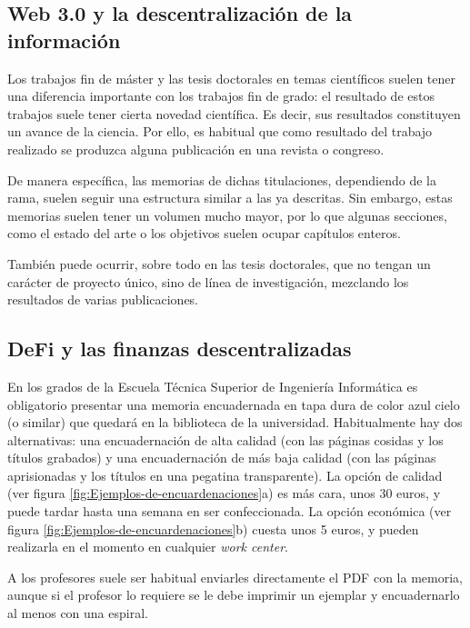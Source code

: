 \documentclass[12pt,spanish,chapterprefix, numbers=noenddot]{book}
\numberwithin{equation}{section}
\numberwithin{figure}{section}
\begin{document}
    \subsection{Web 3.0 y la descentralización de la información}

    Los trabajos fin de máster y las tesis doctorales en temas científicos
    suelen tener una diferencia importante con los trabajos fin de grado:
    el resultado de estos trabajos suele tener cierta novedad científica.
    Es decir, sus resultados constituyen un avance de la ciencia. Por
    ello, es habitual que como resultado del trabajo realizado se produzca
    alguna publicación en una revista o congreso.

    De manera específica, las memorias de dichas titulaciones, dependiendo
    de la rama, suelen seguir una estructura similar a las ya descritas.
    Sin embargo, estas memorias suelen tener un volumen mucho mayor, por
    lo que algunas secciones, como el estado del arte o los objetivos
    suelen ocupar capítulos enteros.

    También puede ocurrir, sobre todo en las tesis doctorales, que no
    tengan un carácter de proyecto único, sino de línea de investigación,
    mezclando los resultados de varias publicaciones.

    \subsection{DeFi y las finanzas descentralizadas}

    En los grados de la Escuela Técnica Superior de Ingeniería Informática
    es obligatorio presentar una memoria encuadernada en tapa dura de
    color azul cielo (o similar) que quedará en la biblioteca de la universidad.
    Habitualmente hay dos alternativas: una encuadernación de alta calidad
    (con las páginas cosidas y los títulos grabados) y una encuadernación
    de más baja calidad (con las páginas aprisionadas y los títulos en
    una pegatina transparente). La opción de calidad (ver figura \ref{fig:Ejemplos-de-encuardenaciones}a)
    es más cara, unos 30 euros, y puede tardar hasta una semana en ser
    confeccionada. La opción económica (ver figura \ref{fig:Ejemplos-de-encuardenaciones}b)
    cuesta unos 5 euros, y pueden realizarla en el momento en cualquier
    \emph{work center}.

    A los profesores suele ser habitual enviarles directamente el PDF
    con la memoria, aunque si el profesor lo requiere se le debe imprimir
    un ejemplar y encuadernarlo al menos con una espiral.
\end{document}
